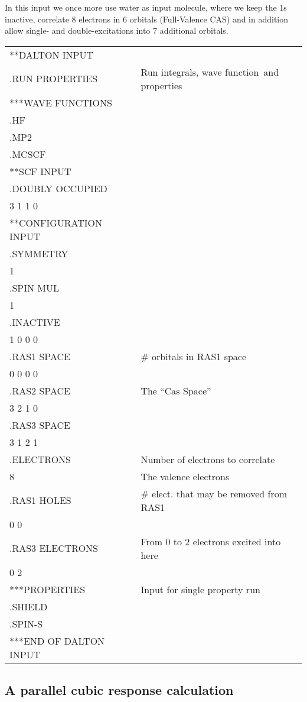 In this input we once more use water as input molecule,
where we keep
the 1s inactive, correlate 8 electrons in 6 orbitals (Full-Valence
CAS) and in addition allow single- and double-excitations into
7 additional orbitals.

{\ttfamily
\begin{tabular}{ll}
**DALTON INPUT\\
.RUN PROPERTIES\hspace{2cm} & Run integrals, wave function\ and properties\\
***WAVE FUNCTIONS\\
.HF\\
.MP2\\
.MCSCF\\
**SCF INPUT\\
.DOUBLY OCCUPIED\\
 3 1 1 0\\
**CONFIGURATION INPUT\\
.SYMMETRY\\
 1\\
.SPIN MUL\\
 1\\
.INACTIVE\\
 1 0 0 0\\
.RAS1 SPACE & \# orbitals in RAS1 space\\
 0 0 0 0\\
.RAS2 SPACE & The ``Cas Space''\\
 3 2 1 0\\
.RAS3 SPACE\\
 3 1 2 1\\
.ELECTRONS  & Number of electrons to correlate\\
 8 & The valence electrons\\
.RAS1 HOLES & \# elect. that may be removed from RAS1\\
 0 0\\
.RAS3 ELECTRONS & From 0 to 2 electrons excited into here\\
 0 2\\
***PROPERTIES & Input for single property run\\
.SHIELD\\
.SPIN-S\\
***END OF DALTON INPUT\\
\end{tabular}}

\subsection{A parallel cubic response calculation}

